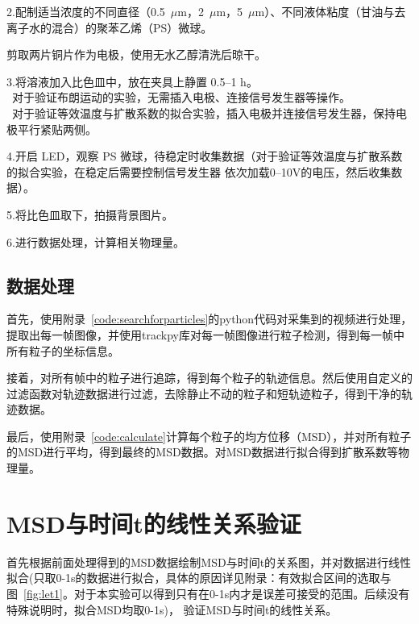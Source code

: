 \documentclass[a4paper]{report} %
\begin{document}
2.配制适当浓度的不同直径（0.5~$\mu$m，2~$\mu$m，5~$\mu$m）、不同液体粘度（甘油与去离子水的混合）的聚苯乙烯（PS）微球。\par
剪取两片铜片作为电极，使用无水乙醇清洗后晾干。\par
3.将溶液加入比色皿中，放在夹具上静置 0.5--1 h。\\ 
\quad \textbullet\ 对于验证布朗运动的实验，无需插入电极、连接信号发生器等操作。 \\
\quad \textbullet\ 对于验证等效温度与扩散系数的拟合实验，插入电极并连接信号发生器，保持电极平行紧贴两侧。\par
4.开启 LED，观察 PS 微球，待稳定时收集数据（对于验证等效温度与扩散系数的拟合实验，在稳定后需要控制信号发生器
依次加载0--10V的电压，然后收集数据）。\par
5.将比色皿取下，拍摄背景图片。\par
6.进行数据处理，计算相关物理量。\par
\subsection{数据处理}
首先，使用附录~\ref{code:searchforparticles}的python代码对采集到的视频进行处理，提取出每一帧图像，并使用trackpy库对每一帧图像进行粒子检测，得到每一帧中所有粒子的坐标信息。\par
接着，对所有帧中的粒子进行追踪，得到每个粒子的轨迹信息。然后使用自定义的过滤函数对轨迹数据进行过滤，去除静止不动的粒子和短轨迹粒子，得到干净的轨迹数据。 \par
最后，使用附录~\ref{code:calculate}计算每个粒子的均方位移（MSD），并对所有粒子的MSD进行平均，得到最终的MSD数据。对MSD数据进行拟合得到扩散系数等物理量。\par
\section{MSD与时间t的线性关系验证}
首先根据前面处理得到的MSD数据绘制MSD与时间t的关系图，并对数据进行线性拟合(只取0-1s的数据进行拟合，具体的原因详见附录：有效拟合区间的选取与图~\ref{fig:let1}。对于本实验可以得到只有在0-1s内才是误差可接受的范围。后续没有特殊说明时，拟合MSD均取0-1s)，
验证MSD与时间t的线性关系。 \par
\end{document}
